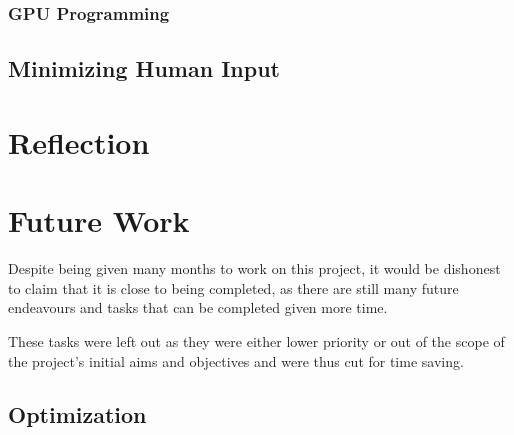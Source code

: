 \documentclass[12pt]{article}
\newcommand{\sentence}{} %
\begin{document}

    \subsubsection{GPU Programming}\label{subsubsec:gpu-programming}

    \subsection{Minimizing Human Input}\label{subsec:minimizing-human-input}


    \pagebreak


    \section{Reflection}\label{sec:reflection}


    \pagebreak


    \section{Future Work}\label{sec:future-work}

    \tab
    Despite being given many months to work on this project, it would be dishonest to claim that it is close to being
    completed, as there are still many future endeavours and tasks that can be completed given more time.
    \sentence
    These tasks were left out as they were either lower priority or out of the scope of the project's initial aims
    and objectives and were thus cut for time saving.
    \sentence

    \subsection{Optimization}\label{subsec:optimization}
\end{document}
